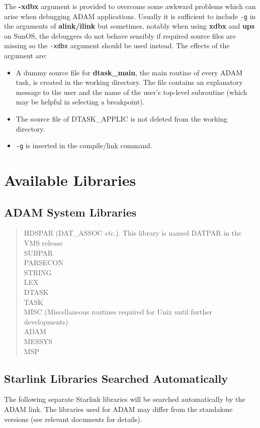 The {\bf -xdbx} argument is provided to overcome some awkward problems which
can arise when debugging ADAM applications. Usually it is sufficient to
include \verb!-g! in the arguments of {\bf alink/ilink} but sometimes, notably 
when using {\bf xdbx} and {\bf ups} on SunOS, the debuggers do not behave
sensibly if required source files are missing so the \verb!-xdbx! argument
should be used instead.
The effects of the argument are:
\begin{itemize}
\item A dummy source file for {\bf dtask\_main}, the main routine of every ADAM
task, is created in the working directory. 
The file contains an explanatory message to the user and the name of the 
user's top-level subroutine (which may be helpful in selecting a breakpoint).
\item The source file of DTASK\_APPLIC is not deleted from the working 
directory.
\item {\verb!-g!} is inserted in the compile/link command.
\end{itemize}
\newpage
\section{Available Libraries}
\label{libs}
\subsection*{ADAM System Libraries}
\begin{verse}
HDSPAR (DAT\_ASSOC {\em etc.}). This library is named DATPAR in the VMS
release \\
SUBPAR \\
PARSECON \\
STRING \\
LEX \\
DTASK \\
TASK \\
MISC (Miscellaneous routines required for Unix until further developments) \\
ADAM \\
MESSYS \\
MSP 
\end{verse}

\subsection*{Starlink Libraries Searched Automatically}
The following separate Starlink libraries will be searched automatically by
the ADAM link. The libraries used for ADAM may differ from the standalone
versions (see relevant documents for details).

